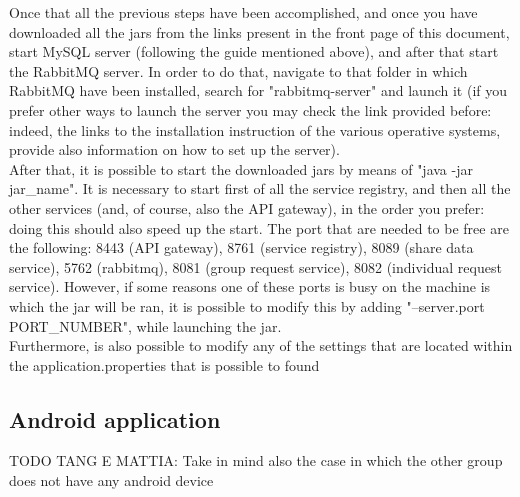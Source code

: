 Once that all the previous steps have been accomplished, and once you have downloaded all the jars from the links present in the front page
of this document, start MySQL server (following the guide mentioned above), and after that start the RabbitMQ server. In order to do that, 
navigate to that folder in which RabbitMQ have been installed, search for "rabbitmq-server" and launch it (if you prefer other ways to launch
the server you may check the link provided before: indeed, the links to the installation instruction of the various operative systems,
provide also information on how to set up the server). \\
After that, it is possible to start the downloaded jars by means of "java -jar jar\_name". 
It is necessary to start first of all the service registry, and then all the other services (and, of course, also the API gateway), in the
order you prefer: doing this should also speed up the start. 
The port that are needed to be free are the following: 8443 (API gateway), 8761 (service registry), 8089 (share data service), 5762
(rabbitmq), 8081 (group request service), 8082 (individual request service). However, if some reasons one of these ports is busy on the
machine is which the jar will be ran, it is possible to modify this by adding "--server.port PORT\_NUMBER", while launching the jar. \\
Furthermore, is also possible to modify any of the settings that are located within the application.properties that is possible to found 




\subsection{Android application}
TODO TANG E MATTIA: Take in mind also the case in which the other group does not have any android device